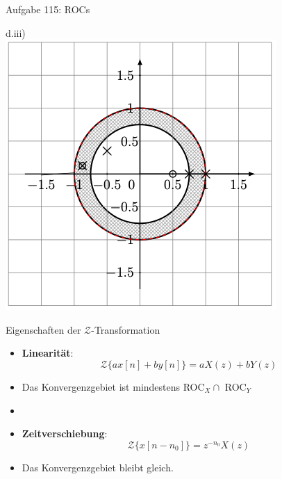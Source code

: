 \documentclass[14pt, aspectratio=169, handout]{beamer}
\begin{document}
\begin{frame}{Aufgabe 115: ROCs}
\begin{minipage}[t]{0.25\textwidth}
\end{minipage}
\hfill
\begin{minipage}[t]{0.25\textwidth}
    d.iii)\\
    \includegraphics[width=\linewidth]{figures/diii.png}
\end{minipage}
\end{frame}

\begin{frame}{Eigenschaften der $\mathcal{Z}$-Transformation}
    \begin{itemize}
    \item \textbf{Linearität}:
        $$\mathcal{Z}\{ax[n] + by[n]\} = aX(z) + bY(z)$$ 
    \item[] Das Konvergenzgebiet ist mindestens ROC$_X \cap $ ROC$_Y$
    \item[] 
    \item \textbf{Zeitverschiebung}:
        $$\mathcal{Z}\{x[n-n_0]\} = z^{-n_0}X(z)$$
    \item[] Das Konvergenzgebiet bleibt gleich.
    \end{itemize}
\end{frame}
\end{document}
